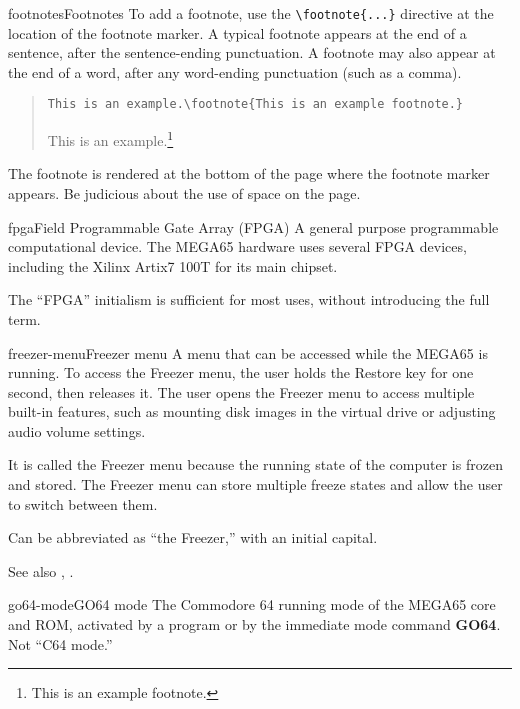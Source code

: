 \begin{sgentry}{footnotes}{Footnotes}
    To add a footnote, use the \texttt{{\textbackslash}footnote\{...\}} directive at the location of the footnote marker. A typical footnote appears at the end of a sentence, after the sentence-ending punctuation. A footnote may also appear at the end of a word, after any word-ending punctuation (such as a comma).

    \begin{quote}
        \texttt{This is an example.{\textbackslash}footnote\{This is an example footnote.\}}

        \hrulefill

        This is an example.\footnote{This is an example footnote.}
    \end{quote}

    The footnote is rendered at the bottom of the page where the footnote marker appears. Be judicious about the use of space on the page.
\end{sgentry}

\begin{sgentry}{fpga}{Field Programmable Gate Array (FPGA)}
    A general purpose programmable computational device. The MEGA65 hardware uses several FPGA devices, including the Xilinx Artix7 100T for its main chipset.

    The ``FPGA'' initialism is sufficient for most uses, without introducing the full term.
\end{sgentry}

\begin{sgentry}{freezer-menu}{Freezer menu}
    A menu that can be accessed while the MEGA65 is running. To access the Freezer menu, the user holds the Restore key for one second, then releases it. The user opens the Freezer menu to access multiple built-in features, such as mounting disk images in the virtual drive or adjusting audio volume settings.

    It is called the Freezer menu because the running state of the computer is frozen and stored. The Freezer menu can store multiple freeze states and allow the user to switch between them.

    Can be abbreviated as ``the Freezer,'' with an initial capital.

    See also , .
\end{sgentry}

\begin{sgentry}{go64-mode}{GO64 mode}
    The Commodore 64 running mode of the MEGA65 core and ROM, activated by a program or by the immediate mode command \textbf{GO64}. Not ``C64 mode.''
\end{sgentry}

